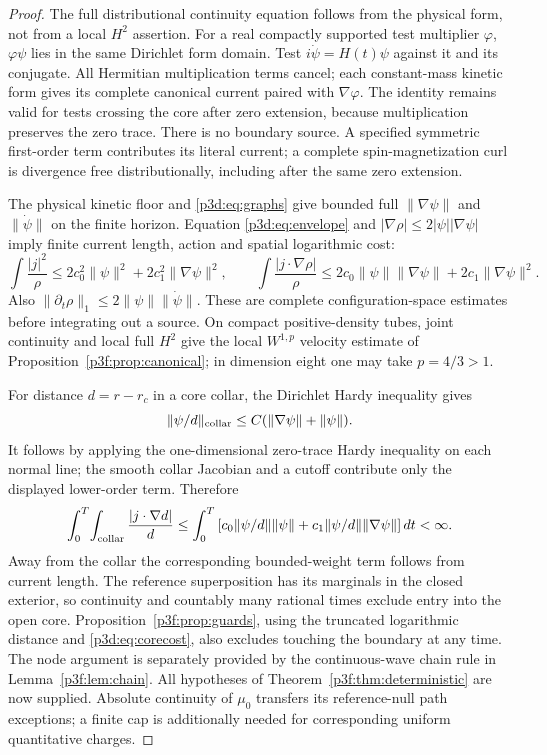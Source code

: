 \documentclass[11pt]{article}
\numberwithin{equation}{section}
\theoremstyle{definition}
\theoremstyle{remark}
\begin{document}
\begin{proof}
The full distributional continuity equation follows from the physical
form, not from a local $H^2$ assertion. For a real compactly supported
test multiplier $\varphi$, $\varphi\psi$ lies in the same Dirichlet form
domain. Test $i\dot\psi=H(t)\psi$ against it and its conjugate.
All Hermitian multiplication terms cancel; each constant-mass kinetic
form gives its complete canonical current paired with $\nabla\varphi$.
The identity remains valid for tests crossing the core after zero
extension, because multiplication preserves the zero trace. There is
no boundary source. A specified symmetric first-order term contributes
its literal current; a complete spin-magnetization curl is divergence
free distributionally, including after the same zero extension.

The physical kinetic floor and \eqref{p3d:eq:graphs} give bounded full
$\|\nabla\psi\|$ and $\|\dot\psi\|$ on the finite horizon. Equation
\eqref{p3d:eq:envelope} and
$|\nabla\rho|\leq2|\psi||\nabla\psi|$ imply finite current length,
action and spatial logarithmic cost:
\[
 \int\frac{|j|^2}{\rho}
 \leq2c_0^2\|\psi\|^2+2c_1^2\|\nabla\psi\|^2,\qquad
 \int\frac{|j\cdot\nabla\rho|}{\rho}
 \leq2c_0\|\psi\|\|\nabla\psi\|+2c_1\|\nabla\psi\|^2.
\]
Also $\|\partial_t\rho\|_1\leq2\|\psi\|\|\dot\psi\|$.
These are complete configuration-space estimates before integrating
out a source. On compact positive-density tubes, joint continuity and
local full $H^2$ give the local $W^{1,p}$ velocity estimate of
Proposition~\ref{p3f:prop:canonical}; in dimension eight one may take
$p=4/3>1$.

For distance $d=r-r_c$ in a core collar, the Dirichlet Hardy inequality
gives
\[
 \|\psi/d\|_{\rm collar}
 \leq C(\|\nabla\psi\|+\|\psi\|).
\]
It follows by applying the one-dimensional zero-trace Hardy inequality
on each normal line; the smooth collar Jacobian and a cutoff contribute
only the displayed lower-order term. Therefore
\begin{equation}\label{p3d:eq:corecost}
 \int_0^T\!\int_{\rm collar}\frac{|j\cdot\nabla d|}{d}
 \leq\int_0^T
 \left[c_0\|\psi/d\|\|\psi\|
       +c_1\|\psi/d\|\|\nabla\psi\|\right]dt<\infty.
\end{equation}
Away from the collar the corresponding bounded-weight term follows
from current length. The reference superposition has its marginals
in the closed exterior, so continuity and countably many rational
times exclude entry into the open core. Proposition~\ref{p3f:prop:guards},
using the truncated logarithmic distance and
\eqref{p3d:eq:corecost}, also excludes touching the boundary at any time.
The node argument is separately provided by the continuous-wave chain
rule in Lemma~\ref{p3f:lem:chain}. All hypotheses of
Theorem~\ref{p3f:thm:deterministic} are now supplied. Absolute continuity
of $\mu_0$ transfers its reference-null path exceptions; a finite cap
is additionally needed for corresponding uniform quantitative charges.
\end{proof}
\end{document}
